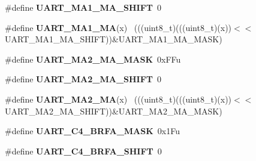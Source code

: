 \begin{DoxyCompactItemize}
\item 
\hypertarget{group___u_a_r_t___register___masks_ga878daa0e87ec3da2299c223b6b234976}{}\#define {\bfseries U\+A\+R\+T\+\_\+\+M\+A1\+\_\+\+M\+A\+\_\+\+S\+H\+I\+F\+T}~0\label{group___u_a_r_t___register___masks_ga878daa0e87ec3da2299c223b6b234976}

\item 
\hypertarget{group___u_a_r_t___register___masks_ga0f6a921bbc9dffba69c13c0b19b70f49}{}\#define {\bfseries U\+A\+R\+T\+\_\+\+M\+A1\+\_\+\+M\+A}(x)                                                  ~(((uint8\+\_\+t)(((uint8\+\_\+t)(x))$<$$<$U\+A\+R\+T\+\_\+\+M\+A1\+\_\+\+M\+A\+\_\+\+S\+H\+I\+F\+T))\&U\+A\+R\+T\+\_\+\+M\+A1\+\_\+\+M\+A\+\_\+\+M\+A\+S\+K)\label{group___u_a_r_t___register___masks_ga0f6a921bbc9dffba69c13c0b19b70f49}

\item 
\hypertarget{group___u_a_r_t___register___masks_ga700f51ab869350daee42b8ae9c655ffd}{}\#define {\bfseries U\+A\+R\+T\+\_\+\+M\+A2\+\_\+\+M\+A\+\_\+\+M\+A\+S\+K}~0x\+F\+Fu\label{group___u_a_r_t___register___masks_ga700f51ab869350daee42b8ae9c655ffd}

\item 
\hypertarget{group___u_a_r_t___register___masks_ga1ecfe245065ed459b087fc0d629b3f07}{}\#define {\bfseries U\+A\+R\+T\+\_\+\+M\+A2\+\_\+\+M\+A\+\_\+\+S\+H\+I\+F\+T}~0\label{group___u_a_r_t___register___masks_ga1ecfe245065ed459b087fc0d629b3f07}

\item 
\hypertarget{group___u_a_r_t___register___masks_gae9ee9c6d7f090dd59543a468f1493d65}{}\#define {\bfseries U\+A\+R\+T\+\_\+\+M\+A2\+\_\+\+M\+A}(x)                                                  ~(((uint8\+\_\+t)(((uint8\+\_\+t)(x))$<$$<$U\+A\+R\+T\+\_\+\+M\+A2\+\_\+\+M\+A\+\_\+\+S\+H\+I\+F\+T))\&U\+A\+R\+T\+\_\+\+M\+A2\+\_\+\+M\+A\+\_\+\+M\+A\+S\+K)\label{group___u_a_r_t___register___masks_gae9ee9c6d7f090dd59543a468f1493d65}

\item 
\hypertarget{group___u_a_r_t___register___masks_ga2f0ab4e5358add87747c744f8ba324fb}{}\#define {\bfseries U\+A\+R\+T\+\_\+\+C4\+\_\+\+B\+R\+F\+A\+\_\+\+M\+A\+S\+K}~0x1\+Fu\label{group___u_a_r_t___register___masks_ga2f0ab4e5358add87747c744f8ba324fb}

\item 
\hypertarget{group___u_a_r_t___register___masks_gae8cac47de1cbd8f8bd2cb10133e4f603}{}\#define {\bfseries U\+A\+R\+T\+\_\+\+C4\+\_\+\+B\+R\+F\+A\+\_\+\+S\+H\+I\+F\+T}~0\label{group___u_a_r_t___register___masks_gae8cac47de1cbd8f8bd2cb10133e4f603}


\end{DoxyCompactItemize}
